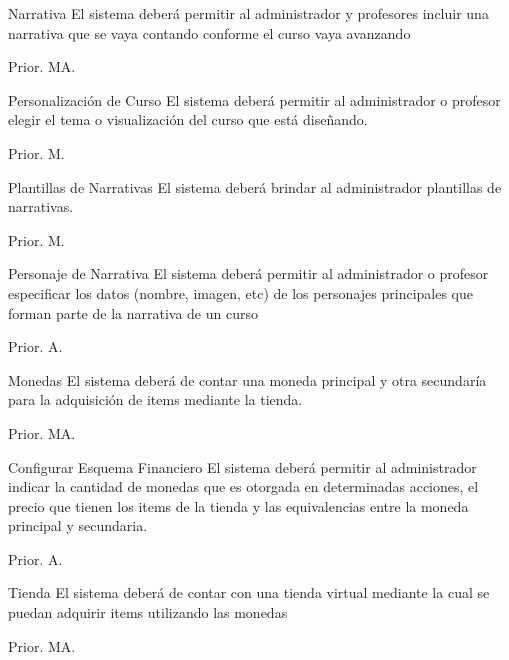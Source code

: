 \begin{RF}{Narrativa}{%
    El sistema deberá permitir al administrador y profesores incluir una narrativa que se vaya contando conforme el curso vaya avanzando}
    \item[] Prior. MA. %
\end{RF}

\begin{RF}{Personalización de Curso}{%
    El sistema deberá permitir al administrador o profesor elegir el tema  o visualización del curso que está diseñando. }
    \item[] Prior. M. %
\end{RF}

\begin{RF}{Plantillas de Narrativas}{%
    El sistema deberá brindar al administrador plantillas de narrativas. }
    \item[] Prior. M. %
\end{RF}

\begin{RF}{Personaje de Narrativa}{%
    El sistema deberá permitir al administrador o profesor especificar los datos (nombre,  imagen, etc) de los personajes principales que forman parte de la narrativa de un curso}
    \item[] Prior. A. %
\end{RF}

\begin{RF}{Monedas}{%
    El sistema deberá de contar una moneda principal y otra secundaría para la adquisición de items mediante la tienda. }
    \item[] Prior. MA. %
\end{RF}

\begin{RF}{Configurar Esquema Financiero}{%
    El sistema deberá permitir al administrador indicar la cantidad de monedas que es otorgada en determinadas acciones, el precio que tienen los items de la tienda y las equivalencias entre la moneda principal y secundaria.}
    \item[] Prior. A. %
\end{RF}

\begin{RF}{Tienda}{%
    El sistema deberá de contar con una tienda virtual mediante la cual se puedan adquirir items utilizando las monedas }
    \item[] Prior. MA. %
\end{RF}

